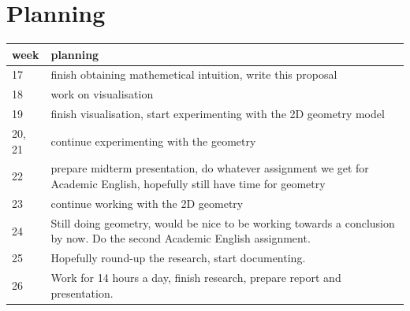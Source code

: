 \documentclass[a4paper, 10pt]{article}
\begin{document}
\section{Planning}
\begin{table}[h!]
  \centering
  \begin{tabular}{| l | p{9cm} |}
    \hline
    week & planning \\
    \hline
    \hline
    17     & finish obtaining mathemetical intuition, write this proposal                                    \\
    \hline
    18     & work on visualisation                                                \\
    \hline
    19     & finish visualisation, start experimenting with the 2D geometry model \\
    \hline
    20, 21 & continue experimenting with the geometry                             \\
    \hline
    22     & prepare midterm presentation, do whatever assignment we get for Academic English, hopefully still have time for geometry                      \\
    \hline
    23     & continue working with the 2D geometry                                \\
    \hline
    24     & Still doing geometry, would be nice to be working towards a conclusion by now. Do the second Academic English assignment.                 \\
    \hline
    25     & Hopefully round-up the research, start documenting.                  \\
    \hline
    26     & Work for 14 hours a day, finish research, prepare report and presentation.   \\
    \hline
  \end{tabular}
\end{table}



\end{document}
